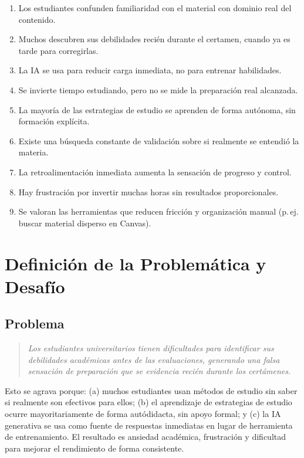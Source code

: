 \documentclass[11pt,a4paper]{article}
\begin{document}
\begin{enumerate}[itemsep=1pt]
\item Los estudiantes confunden familiaridad con el material con dominio real del contenido.
\item Muchos descubren sus debilidades reci\'en durante el certamen, cuando ya es tarde para corregirlas.
\item La IA se usa para reducir carga inmediata, no para entrenar habilidades.
\item Se invierte tiempo estudiando, pero no se mide la preparaci\'on real alcanzada.
\item La mayor\'ia de las estrategias de estudio se aprenden de forma aut\'onoma, sin formaci\'on expl\'icita.
\item Existe una b\'usqueda constante de validaci\'on sobre si realmente se entendi\'o la materia.
\item La retroalimentaci\'on inmediata aumenta la sensaci\'on de progreso y control.
\item Hay frustraci\'on por invertir muchas horas sin resultados proporcionales.
\item Se valoran las herramientas que reducen fricci\'on y organizaci\'on manual (p.\,ej. buscar material disperso en Canvas).
\end{enumerate}

\section{Definici\'on de la Problem\'atica y Desaf\'io}

\subsection{Problema}

\begin{quote}
\itshape Los estudiantes universitarios tienen dificultades para identificar sus debilidades acad\'emicas antes de las evaluaciones, generando una falsa sensaci\'on de preparaci\'on que se evidencia reci\'en durante los cert\'amenes.
\end{quote}

Esto se agrava porque: (a) muchos estudiantes usan m\'etodos de estudio sin saber si realmente son efectivos para ellos; (b) el aprendizaje de estrategias de estudio ocurre mayoritariamente de forma aut\'odidacta, sin apoyo formal; y (c) la IA generativa se usa como fuente de respuestas inmediatas en lugar de herramienta de entrenamiento. El resultado es ansiedad acad\'emica, frustraci\'on y dificultad para mejorar el rendimiento de forma consistente.
\end{document}
